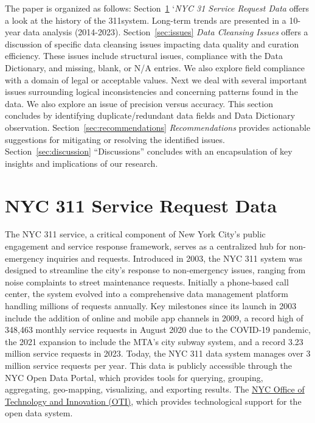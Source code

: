 \documentclass[12pt, titlepage]{article}
\begin{document}
The paper is organized as follows:
Section~\ref{sec:data} `\textit{NYC 31 Service Request Data} offers a 
look at the history of the 311system. Long-term trends are 
presented in a 10-year data analysis (2014-2023).
Section~\ref{sec:issues} \textit{Data Cleansing Issues} offers a 
discussion of specific data cleansing issues impacting data quality and 
curation efficiency. These issues include structural issues, compliance 
with the Data Dictionary, and missing, blank, or N/A entries. We also
explore field compliance with a domain of legal or acceptable values.
Next we deal with several important issues surrounding logical inconsistencies 
and concerning patterns found in the data. We also explore an issue of precision 
versus accuracy. This section concludes by identifying duplicate/redundant data fields
and Data Dictionary observation. Section~\ref{sec:recommendations} 
\textit{Recommendations} provides actionable suggestions for 
mitigating or resolving the identified issues. Section~\ref{sec:discussion} ``Discussions'' 
concludes with an encapsulation of key insights and implications of our research.


\section{NYC 311 Service Request Data} 
\label{sec:data}
The NYC 311 service, a critical component of New York City's public
engagement and service response framework, serves as a centralized hub
for non-emergency inquiries and requests. Introduced in 2003, the NYC
311 system was designed to streamline the city's response to
non-emergency issues, ranging from noise complaints to street
maintenance requests. Initially a phone-based call center, the system
evolved into a comprehensive data management platform handling
millions of requests annually. Key milestones since its launch in 2003
include the addition of online and mobile app channels in 2009, a
record high of 348,463 monthly service requests in August 2020 due to
the COVID-19 pandemic, the 2021 expansion to include the MTA's city
subway system, and a record 3.23 million service requests in
2023. Today, the NYC 311 data system manages over 3 million service
requests per year. This data is publicly accessible through the NYC Open Data
Portal, which provides tools for querying, grouping, aggregating,
geo-mapping, visualizing, and exporting results. The
\href{https://www.nyc.gov/content/oti/pages/}{NYC Office of Technology
  and Innovation (OTI)}, which provides technological support for the
open data system. 
\end{document}
